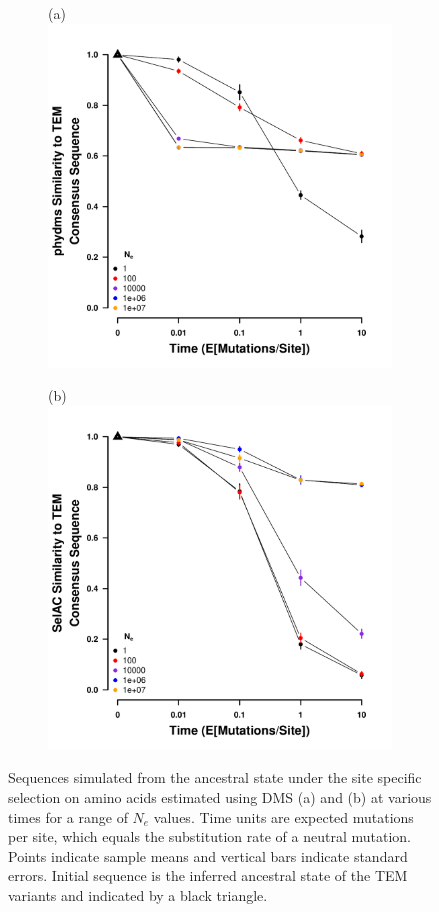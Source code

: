 \documentclass[fleqn,letterpaper]{article}
\begin{document}
\begin{figure}
    \centering
    \begin{subfigure}
        \centering
       (a)\includegraphics[width=.45\textwidth]{img/simulated_dist_time_DMS_ancest.pdf}
    \end{subfigure}
    \begin{subfigure}
        \centering
        (b)\includegraphics[width=.45\textwidth]{img/simulated_dist_time_SELAC_ancest.pdf}
    \end{subfigure}
    \caption{Sequences simulated from the ancestral state under the site specific selection on amino acids estimated using DMS (a) and \selac (b) at various times for a range of $N_e$ values.
    Time units are expected mutations per site, which equals the substitution rate of a neutral mutation.
    Points indicate sample means and vertical bars indicate standard errors. Initial sequence is the inferred ancestral state of the TEM variants and indicated by a black triangle.}
    \label{fig:dis_sim}
\end{figure}

\clearpage
\end{document}
